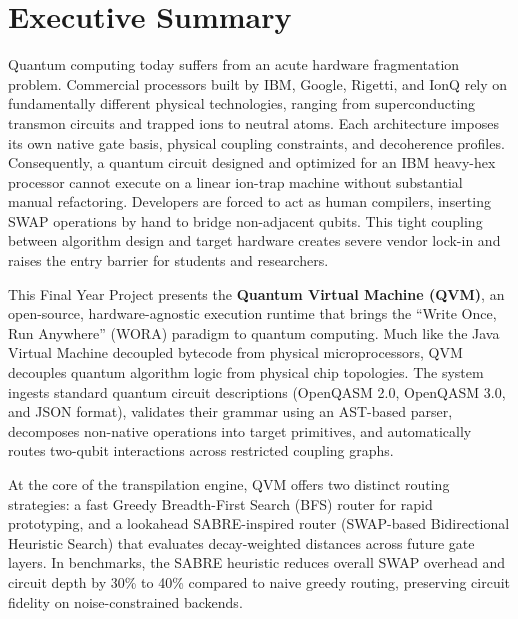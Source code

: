 
\chapter*{Executive Summary}

Quantum computing today suffers from an acute hardware fragmentation problem. Commercial processors built by IBM, Google, Rigetti, and IonQ rely on fundamentally different physical technologies, ranging from superconducting transmon circuits and trapped ions to neutral atoms. Each architecture imposes its own native gate basis, physical coupling constraints, and decoherence profiles. Consequently, a quantum circuit designed and optimized for an IBM heavy-hex processor cannot execute on a linear ion-trap machine without substantial manual refactoring. Developers are forced to act as human compilers, inserting SWAP operations by hand to bridge non-adjacent qubits. This tight coupling between algorithm design and target hardware creates severe vendor lock-in and raises the entry barrier for students and researchers.

This Final Year Project presents the \textbf{Quantum Virtual Machine (QVM)}, an open-source, hardware-agnostic execution runtime that brings the ``Write Once, Run Anywhere'' (WORA) paradigm to quantum computing. Much like the Java Virtual Machine decoupled bytecode from physical microprocessors, QVM decouples quantum algorithm logic from physical chip topologies. The system ingests standard quantum circuit descriptions (OpenQASM 2.0, OpenQASM 3.0, and JSON format), validates their grammar using an AST-based parser, decomposes non-native operations into target primitives, and automatically routes two-qubit interactions across restricted coupling graphs.

At the core of the transpilation engine, QVM offers two distinct routing strategies: a fast Greedy Breadth-First Search (BFS) router for rapid prototyping, and a lookahead SABRE-inspired router (SWAP-based Bidirectional Heuristic Search) that evaluates decay-weighted distances across future gate layers. In benchmarks, the SABRE heuristic reduces overall SWAP overhead and circuit depth by 30\% to 40\% compared to naive greedy routing, preserving circuit fidelity on noise-constrained backends.

